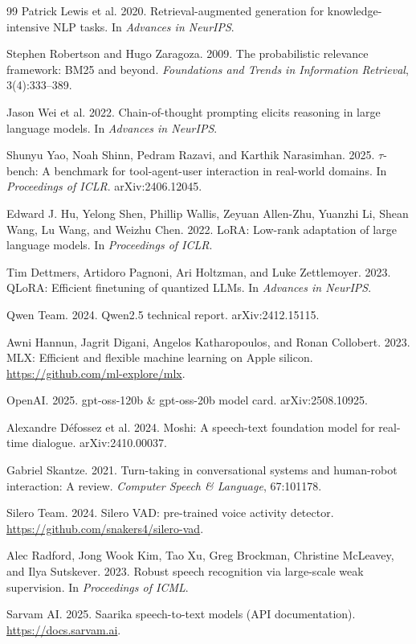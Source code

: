 \documentclass[11pt,a4paper]{article}
\begin{document}
\begin{thebibliography}{99}
 Patrick Lewis et al. 2020. Retrieval-augmented generation for knowledge-intensive NLP tasks. In
\emph{Advances in NeurIPS}.

 Stephen Robertson and Hugo Zaragoza. 2009. The probabilistic relevance framework: BM25 and beyond.
\emph{Foundations and Trends in Information Retrieval}, 3(4):333--389.

 Jason Wei et al. 2022. Chain-of-thought prompting elicits reasoning in large language models. In
\emph{Advances in NeurIPS}.

 Shunyu Yao, Noah Shinn, Pedram Razavi, and Karthik Narasimhan. 2025. $\tau$-bench: A benchmark for
tool-agent-user interaction in real-world domains. In \emph{Proceedings of ICLR}. arXiv:2406.12045.

 Edward J. Hu, Yelong Shen, Phillip Wallis, Zeyuan Allen-Zhu, Yuanzhi Li, Shean Wang, Lu Wang, and
Weizhu Chen. 2022. LoRA: Low-rank adaptation of large language models. In \emph{Proceedings of ICLR}.

 Tim Dettmers, Artidoro Pagnoni, Ari Holtzman, and Luke Zettlemoyer. 2023. QLoRA: Efficient
finetuning of quantized LLMs. In \emph{Advances in NeurIPS}.

 Qwen Team. 2024. Qwen2.5 technical report. arXiv:2412.15115.

 Awni Hannun, Jagrit Digani, Angelos Katharopoulos, and Ronan Collobert. 2023. MLX: Efficient and
flexible machine learning on Apple silicon. \url{https://github.com/ml-explore/mlx}.

 OpenAI. 2025. gpt-oss-120b \& gpt-oss-20b model card. arXiv:2508.10925.

 Alexandre D{\'e}fossez et al. 2024. Moshi: A speech-text foundation model for real-time dialogue.
arXiv:2410.00037.

 Gabriel Skantze. 2021. Turn-taking in conversational systems and human-robot interaction: A review.
\emph{Computer Speech \& Language}, 67:101178.

 Silero Team. 2024. Silero VAD: pre-trained voice activity detector.
\url{https://github.com/snakers4/silero-vad}.

 Alec Radford, Jong Wook Kim, Tao Xu, Greg Brockman, Christine McLeavey, and Ilya Sutskever. 2023.
Robust speech recognition via large-scale weak supervision. In \emph{Proceedings of ICML}.

 Sarvam AI. 2025. Saarika speech-to-text models (API documentation). \url{https://docs.sarvam.ai}.


\end{thebibliography}
\end{document}
